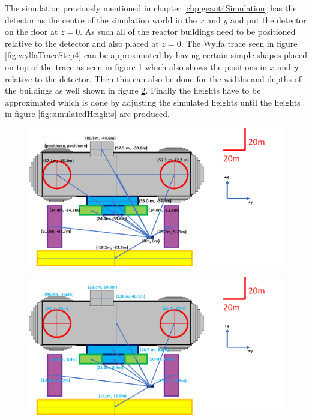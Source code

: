 The simulation previously mentioned in chapter \ref{chp:geant4Simulation} has the detector as the centre of the simulation world in the $x$ and $y$ and put the detector on the floor at  $z = 0 $. As such all of the reactor buildings need to be positioned relative to the detector and also placed at $z = 0$. The Wylfa trace seen in figure \ref{fig:wylfaTraceStep4} can be approximated by having certain simple shapes placed on top of the trace as seen in figure \ref{fig:simulatedPositions} which also shows the positions in $x$ and $y$ relative to the detector. Then this can also be done for the widths and depths of the buildings as well shown in figure \ref{fig:simulatedWidthsDepths}. Finally the heights have to be approximated which is done by adjusting the simulated heights until the heights in figure \ref{fig:simulatedHeights} are produced.

 \begin{figure}[htbp]
 \centering
 \includegraphics[width=\linewidth]{Chapter5/Figs/wylfaRasterNew/simulatedPositions.png}
 \label{fig:simulatedPositions}
\end{figure}

\begin{figure}[htbp]
 \centering
 \includegraphics[width=\linewidth]{Chapter5/Figs/wylfaRasterNew/simulatedWidthsDepths.png}
 \label{fig:simulatedWidthsDepths}
\end{figure}

